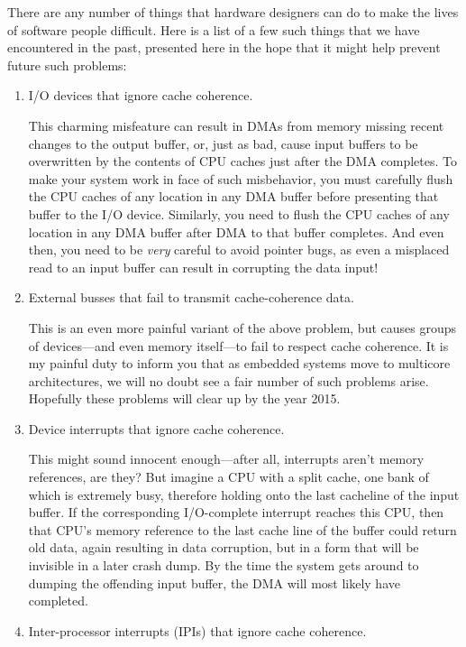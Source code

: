 There are any number of things that hardware designers can do
to make the lives of software people difficult.
Here is a list of a few such things that we have encountered in
the past, presented here in the hope that it might help prevent
future such problems:
\begin{enumerate}
\item	I/O devices that ignore cache coherence.

	This charming misfeature can result in DMAs from memory
	missing recent changes to the output buffer, or, just as
	bad, cause input buffers to be overwritten by the contents
	of CPU caches just after the DMA completes.
	To make your system work in face of such misbehavior,
	you must carefully flush the CPU caches of any location
	in any DMA buffer before presenting that buffer to the
	I/O device.
	Similarly, you need to flush the CPU caches of any location
	in any DMA buffer after DMA to that buffer completes.
	And even then, you need to be \emph{very} careful to avoid
	pointer bugs, as even a misplaced read to an input buffer
	can result in corrupting the data input!

\item	External busses that fail to transmit cache-coherence data.

	This is an even more painful variant of the above problem,
	but causes groups of devices---and even memory itself---to
	fail to respect cache coherence.
	It is my painful duty to inform you that as embedded systems
	move to multicore architectures, we will no doubt see a fair
	number of such problems arise.
	Hopefully these problems will clear up by the year 2015.

\item	Device interrupts that ignore cache coherence.

	This might sound innocent enough---after all, interrupts
	aren't memory references, are they?
	But imagine a CPU with a split cache, one bank of which is
	extremely busy, therefore holding onto the last cacheline
	of the input buffer.
	If the corresponding I/O-complete interrupt reaches this
	CPU, then that CPU's memory reference to the last cache
	line of the buffer could return old data, again resulting
	in data corruption, but in a form that will be invisible
	in a later crash dump.
	By the time the system gets around to dumping the offending
	input buffer, the DMA will most likely have completed.

\item	Inter-processor interrupts (IPIs) that ignore cache coherence.


\end{enumerate}
